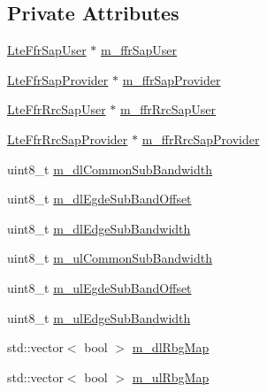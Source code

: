 \subsection*{Private Attributes}
\begin{DoxyCompactItemize}
\item 
\hyperlink{classns3_1_1LteFfrSapUser}{Lte\+Ffr\+Sap\+User} $\ast$ \hyperlink{classns3_1_1LteFrStrictAlgorithm_a394c9de6fce2e0d2cc1f48bf24634e8a}{m\+\_\+ffr\+Sap\+User}
\item 
\hyperlink{classns3_1_1LteFfrSapProvider}{Lte\+Ffr\+Sap\+Provider} $\ast$ \hyperlink{classns3_1_1LteFrStrictAlgorithm_ae9b5429be54c1d1d68dcec38c0aac054}{m\+\_\+ffr\+Sap\+Provider}
\item 
\hyperlink{classns3_1_1LteFfrRrcSapUser}{Lte\+Ffr\+Rrc\+Sap\+User} $\ast$ \hyperlink{classns3_1_1LteFrStrictAlgorithm_a93f2cf37ba111450c9eca44fe33f704a}{m\+\_\+ffr\+Rrc\+Sap\+User}
\item 
\hyperlink{classns3_1_1LteFfrRrcSapProvider}{Lte\+Ffr\+Rrc\+Sap\+Provider} $\ast$ \hyperlink{classns3_1_1LteFrStrictAlgorithm_a27a8ef694b40e43ef99c4761910df180}{m\+\_\+ffr\+Rrc\+Sap\+Provider}
\item 
uint8\+\_\+t \hyperlink{classns3_1_1LteFrStrictAlgorithm_a22e3907faf3ed6210a76917b4f6b85f2}{m\+\_\+dl\+Common\+Sub\+Bandwidth}
\item 
uint8\+\_\+t \hyperlink{classns3_1_1LteFrStrictAlgorithm_a14a0d313383204ba31885713420328f5}{m\+\_\+dl\+Egde\+Sub\+Band\+Offset}
\item 
uint8\+\_\+t \hyperlink{classns3_1_1LteFrStrictAlgorithm_a509afeff3e6cb5c947b6681ed980c59f}{m\+\_\+dl\+Edge\+Sub\+Bandwidth}
\item 
uint8\+\_\+t \hyperlink{classns3_1_1LteFrStrictAlgorithm_a084d7a8d816f5c82155be6381333a797}{m\+\_\+ul\+Common\+Sub\+Bandwidth}
\item 
uint8\+\_\+t \hyperlink{classns3_1_1LteFrStrictAlgorithm_a4f177f41bee1fdb257412b3f83874d8c}{m\+\_\+ul\+Egde\+Sub\+Band\+Offset}
\item 
uint8\+\_\+t \hyperlink{classns3_1_1LteFrStrictAlgorithm_a3e5d87899b41ec73b5e4aa65465e497a}{m\+\_\+ul\+Edge\+Sub\+Bandwidth}
\item 
std\+::vector$<$ bool $>$ \hyperlink{classns3_1_1LteFrStrictAlgorithm_ada7b38f4d852af7211c55391268e3899}{m\+\_\+dl\+Rbg\+Map}
\item 
std\+::vector$<$ bool $>$ \hyperlink{classns3_1_1LteFrStrictAlgorithm_a03dc05c98509a94c988e950cea9aa3d9}{m\+\_\+ul\+Rbg\+Map}
\item 

\end{DoxyCompactItemize}
